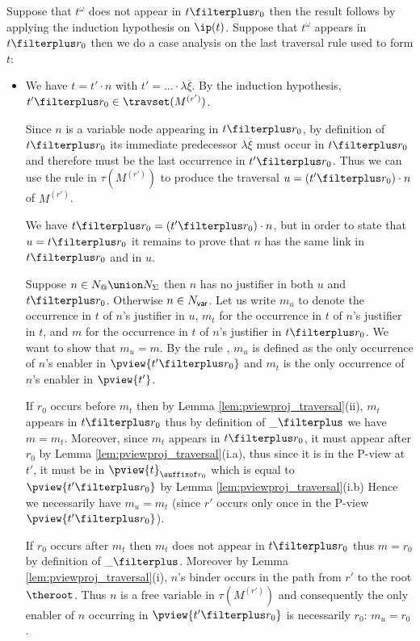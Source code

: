    Suppose that $t^\omega$ does not appear in $t \filterplus r_0$ then
    the result follows by applying the induction hypothesis on $\ip(t)$.
    Suppose that $t^\omega$ appears in $t \filterplus r_0$ then we do a case analysis on the last traversal rule used to form $t$:
    \begin{itemize}
    \item {}
        We have  $t = t' \cdot n$ with $t' = \ldots \cdot \lambda \overline{\xi}$. By the induction hypothesis, $t' \filterplus r_0 \in  \travset(M^{(r')})$.

        Since $n$ is a variable node appearing in $t\filterplus r_0$, by definition of $t\filterplus r_0$ its immediate predecessor
        $\lambda \overline{\xi}$ must occur in $t\filterplus r_0$ and therefore must be the last occurrence in $t'\filterplus r_0$. Thus we can use the rule  in $\tau(M^{(r')})$ to produce the traversal $u = (t'\filterplus r_0) \cdot n$ of $M^{(r')}$.

        We have $t \filterplus r_0 = (t'\filterplus r_0) \cdot n$, but in order to state that $u = t \filterplus r_0$ it remains to prove that $n$ has the same link in $t \filterplus r_0$ and in $u$.

        Suppose $n \in N_@ \union N_\Sigma$ then $n$ has no justifier in both $u$ and $t\filterplus r_0$. Otherwise $n \in N_{\sf var}$. Let us write $m_u$ to denote the occurrence in $t$ of $n$'s justifier in $u$, $m_t$ for the occurrence in $t$ of $n$'s justifier in $t$, and $m$ for the occurrence in $t$ of $n$'s justifier in $t \filterplus r_0$. We want to show that $m_u = m$.
        By the rule , $m_u$ is defined as the only occurrence of $n$'s enabler in $\pview{t'\filterplus r_0}$ and $m_t$ is the only occurrence of $n$'s enabler in $\pview{t'}$.

        If $r_0$ occurs before $m_t$ then by Lemma \ref{lem:pviewproj_traversal}(ii), $m_t$ appears in $t \filterplus r_0$ thus by definition of $\_ \filterplus$ we have $m = m_t$. Moreover, since $m_t$ appears in $t\filterplus r_0$, it must appear
        after $r_0$ by Lemma \ref{lem:pviewproj_traversal}(i.a), thus since it is in the P-view at $t'$, it must be
        in $\pview{t}_{\suffixof r_0}$ which is equal to $\pview{t'\filterplus r_0}$ by Lemma \ref{lem:pviewproj_traversal}(i.b)
        Hence we necessarily have $m_u = m_t$ (since $r'$ occurs only once in the P-view $\pview{t'\filterplus r_0}$).

        If $r_0$ occurs after $m_t$ then $m_t$ does not appear in $t\filterplus r_0$ thus $m = r_0$ by definition of $\_ \filterplus$. Moreover by Lemma \ref{lem:pviewproj_traversal}(i), $n$'s binder occurs in the path from $r'$ to the root $\theroot$. Thus $n$ is a free variable in $\tau(M^{(r')})$ and consequently the only enabler of $n$ occurring in $\pview{t'\filterplus r_0}$ is necessarily $r_0$: $m_u = r_0$.


\end{itemize}
